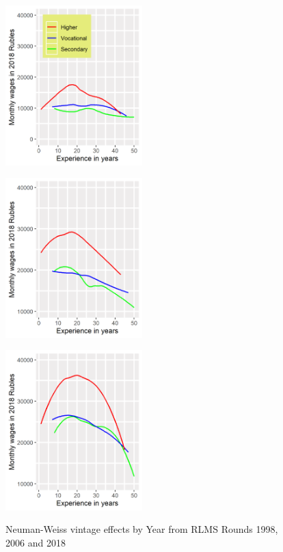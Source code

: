 \documentclass[12pt,a4paper]{article}
\numberwithin{equation}{section}
\begin{document}
	
	\begin{figure}[H]
		\begin{minipage}[b]{.3\linewidth}
			\centering
			\hspace*{-0.7in}
			\includegraphics[width=150pt]{dp01_98.png}
			\label{fig:2.2a}
		\end{minipage}
		\hfill
		\begin{minipage}[b]{.3\linewidth}
			\centering
			\hspace*{-0.7in}
			\includegraphics[width=150pt]{dp01_06.png}
			\label{fig:2.2b}
		\end{minipage}
		\hfill
		\begin{minipage}[b]{.3\linewidth}
			\centering
			\hspace*{-0.7in}
			\includegraphics[width=150pt]{dp01_18.png}
			\label{fig:2.2c}
		\end{minipage}
		\caption{Neuman-Weiss vintage effects by Year from RLMS Rounds 1998, 2006 and 2018}\label{fig:2.2}
	\end{figure}
\end{document}

